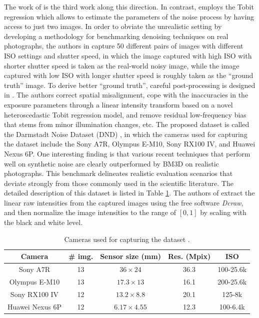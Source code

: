 The work of \cite{dnd2017} is the third work along this direction. In contrast, \cite{dnd2017} employs the Tobit regression which allows to estimate the parameters of the noise process by having access to just two images. In order to obviate the unrealistic setting by developing a methodology for benchmarking denoising techniques on real photographs, the authors in \cite{dnd2017} capture 50 different pairs of images with different ISO settings and shutter speed, in which the image captured with high ISO with shorter shutter speed is taken as the real-world noisy image, while the image captured with low ISO with longer shutter speed is roughly taken as the ``ground truth'' image. To derive better ``ground truth'', careful post-processing is designed in \cite{dnd2017}. The authors correct spatial misalignment, cope with the inaccuracies in the exposure parameters through a linear intensity transform based on a novel heteroscedastic Tobit regression model, and remove residual low-frequency bias that stems from minor illumination changes, etc. The proposed dataset is called the Darmstadt Noise Dataset (DND) \cite{dnd2017}, in which the cameras used for capturing the dataset include the Sony A7R, Olympus E-M10, Sony RX100 IV, and Huawei Nexus 6P. One interesting finding is that various recent techniques that perform well on synthetic noise are clearly outperformed by BM3D \cite{bm3d} on realistic photographs. This benchmark delineates realistic evaluation scenarios that deviate strongly from those commonly used in the scientific literature. The detailed description of this dataset is listed in Table \ref{tab6-3}. The authors of \cite{dnd2017} extract the linear raw intensities from the captured images using the free software \textsl{Dcraw}, and then normalize the image intensities to the range of $[0, 1]$ by scaling with the black and white level.

\begin{table}[ht!]
\caption{Cameras used for capturing the dataset \cite{dnd2017}.}

\label{tab6-3}
\begin{center}
\small
\renewcommand\arraystretch{1.2}
\begin{tabular*}{1\textwidth}{@{\extracolsep{\fill}}ccccc}
\hline
Camera
&
\# img.
&
Sensor size (mm)
&
Res. (Mpix)
&
ISO
\\
\hline
Sony A7R & 13  & $36\times24$  & 36.3  & 100-25.6k
\\
\hline
Olympus E-M10 & 13  & $17.3\times13$  & 16.1  & 200-25.6k 
\\
\hline   
Sony RX100 IV & 12 & $13.2\times8.8$  & 20.1  & 125-8k 
\\
\hline   
Huawei Nexus 6P & 12 & $6.17\times4.55$  & 12.3  & 100-6.4k 
\\
\hline
\end{tabular*}
\end{center}
\end{table}


